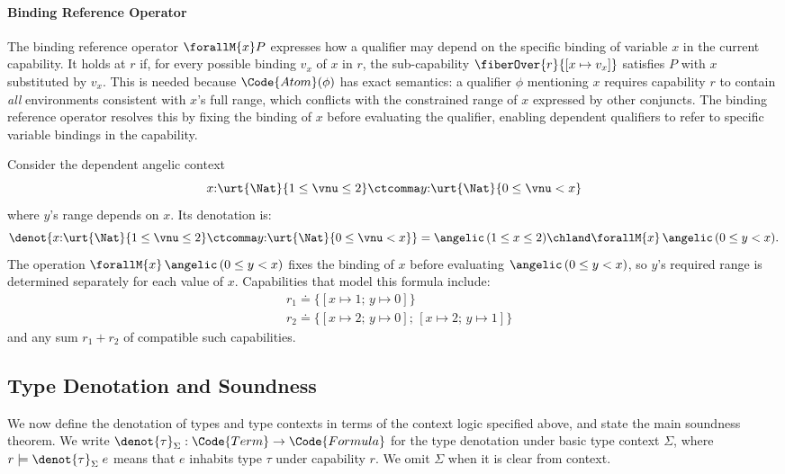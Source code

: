 \paragraph{Binding Reference Operator}
The binding reference operator $\forallM{x} P$ expresses how a
qualifier may depend on the specific binding of variable $x$ in the
current capability.  It holds at $r$ if, for every possible binding $v_x$
of $x$ in $r$, the sub-capability $\fiberOver{r}{[x \mapsto v_x]}$
satisfies $P$ with $x$ substituted by $v_x$.  This is needed because
$\Code{Atom}(\phi)$ has exact semantics: a qualifier $\phi$ mentioning
$x$ requires capability $r$ to contain \emph{all} environments
consistent with $x$'s full range, which conflicts with the constrained
range of $x$ expressed by other conjuncts.  The binding reference operator
resolves this by fixing the binding of $x$ before evaluating the
qualifier, enabling dependent qualifiers to refer to specific variable
bindings in the capability.

\begin{example}\label{ex-variable-reference}
  Consider the dependent angelic context
  \[x{:}\urt{\Nat}{1 \leq \vnu
    \leq 2} \ctcomma y{:}\urt{\Nat}{0 \leq \vnu < x}\]
\noindent where $y$'s
  range depends on $x$.  Its denotation is:
  \[
    \denot{x{:}\urt{\Nat}{1 \leq \vnu \leq 2} \ctcomma y{:}\urt{\Nat}{0 \leq \vnu < x}}
    = \angelic\,(1 \leq x \leq 2) \chland \forallM{x}\,\angelic\,(0 \leq y < x).
  \]
  The operation $\forallM{x}\,\angelic\,(0 \leq y < x)$ fixes the
  binding of $x$ before evaluating $\angelic\,(0 \leq y < x)$, so
  $y$'s required range is determined separately for each value of $x$.
  Capabilities that model this formula include:
  \begin{align*}
    &r_1 \doteq \{[x \mapsto 1;\, y \mapsto 0]\} \\
    &r_2 \doteq \{[x \mapsto 2;\, y \mapsto 0];\, [x \mapsto 2;\, y \mapsto 1]\}
  \end{align*}
  and any sum $r_1 + r_2$ of compatible such capabilities.
\end{example}

\subsection{Type Denotation and Soundness}\label{subsec:denotation}

We now define the denotation of types and type contexts in terms of
the context logic specified above, and state the main soundness
theorem.  We write $\denot{\tau}_\Sigma : \Code{Term} \to
\Code{Formula}$ for the type denotation under basic type context
$\Sigma$, where $r \models \denot{\tau}_\Sigma\;e$ means that $e$
inhabits type $\tau$ under capability $r$.  We omit $\Sigma$ when it
is clear from context.

